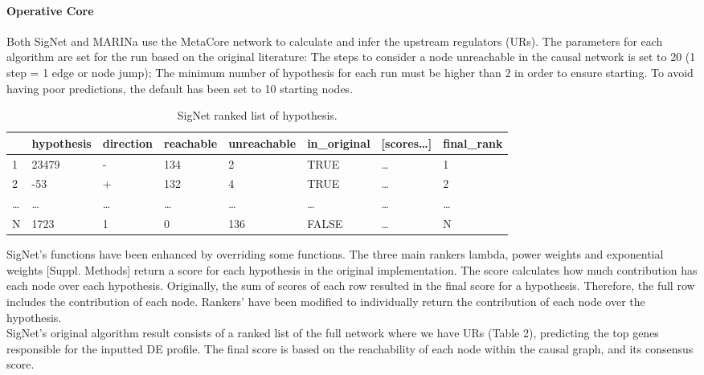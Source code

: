 \paragraph{Operative Core}
Both SigNet and MARINa use the MetaCore network to calculate and infer the upstream regulators (URs). The parameters for each algorithm are set for the run based on the original literature: The steps to consider a node unreachable in the causal network is set to 20 (1 step = 1 edge or node jump); The minimum number of hypothesis for each run must be higher than 2 in order to ensure starting. To avoid having poor predictions, the default has been set to 10 starting nodes.
\\
\begin{table}[!h]
\begin{tabular}{|l|l|l|l|l|l|l|l|}
\hline
  & hypothesis & direction & reachable & unreachable & in\_original & {[}scores…{]} & final\_rank \\ \hline
1 & 23479      & -         & 134       & 2           & TRUE         & …             & 1           \\ \hline
2 & -53        & +         & 132       & 4           & TRUE         & …             & 2           \\ \hline
… & …          & …         & …         & …           & …            & …             & …           \\ \hline
N & 1723       & 1         & 0         & 136         & FALSE        & …             & N           \\ \hline
\end{tabular}
\caption{SigNet ranked list of hypothesis.}
\label{tbl:signet_output}
\end{table}

SigNet’s functions have been enhanced by overriding some functions. The three main rankers lambda, power weights and exponential weights [Suppl. Methods] return a score for each hypothesis in the original implementation. The score calculates how much contribution has each node over each hypothesis. Originally, the sum of scores of each row resulted in the final score for a hypothesis. Therefore, the full row includes the contribution of each node. Rankers’ have been modified to individually return the contribution of each node over the hypothesis.
\\

SigNet’s original algorithm result consists of a ranked list of the full network where we have URs (Table 2), predicting the top genes responsible for the inputted DE profile. The final score is based on the reachability of each node within the causal graph, and its consensus score.
\\

